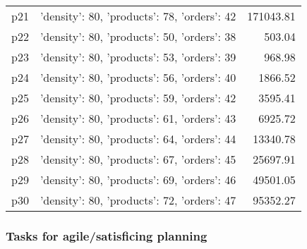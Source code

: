 \documentclass{article}
\begin{document}
\begin{center}
\begin{tabular}{@{}l|r|r@{}}
  p21&{'density': 80, 'products': 78, 'orders': 42}&171043.81\\
  p22&{'density': 80, 'products': 50, 'orders': 38}&503.04\\
  p23&{'density': 80, 'products': 53, 'orders': 39}&968.98\\
  p24&{'density': 80, 'products': 56, 'orders': 40}&1866.52\\
  p25&{'density': 80, 'products': 59, 'orders': 42}&3595.41\\
  p26&{'density': 80, 'products': 61, 'orders': 43}&6925.72\\
  p27&{'density': 80, 'products': 64, 'orders': 44}&13340.78\\
  p28&{'density': 80, 'products': 67, 'orders': 45}&25697.91\\
  p29&{'density': 80, 'products': 69, 'orders': 46}&49501.05\\
  p30&{'density': 80, 'products': 72, 'orders': 47}&95352.27
                            \end{tabular}
                            \end{center}
                    

                                \subsubsection*{Tasks for agile/satisficing planning}
                                
\end{document}
